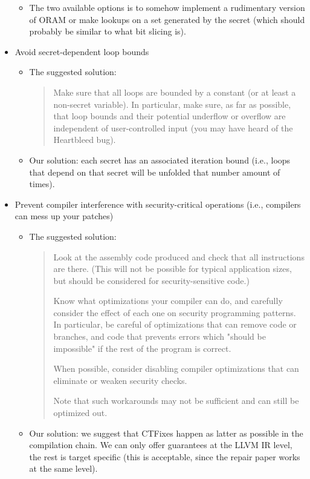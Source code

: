 \begin{itemize}
\begin{itemize}
\begin{quote}
\end{quote}
\item The two available options is to somehow implement a rudimentary version of ORAM or make lookups on a set generated by the secret (which should probably be similar to what bit slicing is).
\end{itemize}
\item Avoid secret-dependent loop bounds
\begin{itemize}
\item The suggested solution: 
\begin{quote}
Make sure that all loops are bounded by a constant (or at least a non-secret variable). In particular, make sure, as far as possible, that loop bounds and their potential underflow or overflow are independent of user-controlled input (you may have heard of the Heartbleed bug).
\end{quote}
\item Our solution: each secret has an associated iteration bound (i.e., loops that depend on that secret will be unfolded that number amount of times).
\end{itemize}
\item Prevent compiler interference with security-critical operations (i.e., compilers can mess up your patches)
\begin{itemize}

\item The suggested solution: 
\begin{quote}
Look at the assembly code produced and check that all instructions are there. (This will not be possible for typical application sizes, but should be considered for security-sensitive code.)

Know what optimizations your compiler can do, and carefully consider the effect of each one on security programming patterns. In particular, be careful of optimizations that can remove code or branches, and code that prevents errors which "should be impossible" if the rest of the program is correct.

When possible, consider disabling compiler optimizations that can eliminate or weaken security checks.

Note that such workarounds may not be sufficient and can still be optimized out.
\end{quote}
\item Our solution: we suggest that CTFixes happen as latter as possible in the compilation chain. We can only offer guarantees at the LLVM IR level, the rest is target specific (this is acceptable, since the repair paper works at the same level).
\end{itemize}


\end{itemize}
